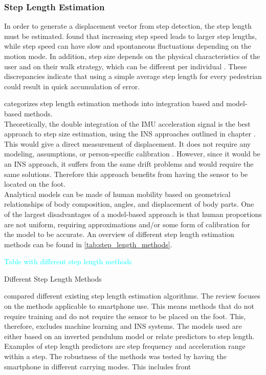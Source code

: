

\subsubsection{Step Length Estimation}
In order to generate a displacement vector from step detection, the step length must be estimated. \citet{Collins2013a} found that increasing step speed leads to larger step lengths, while step speed can have slow and spontaneous fluctuations depending on the motion mode. In addition, step size depends on the physical characteristics of the user and on their walk strategy, which can be different per individual \cite{Diez2018}. These discrepancies indicate that using a simple average step length for every pedestrian could result in quick accumulation of error. 

\citet{Diez2018} categorizes step length estimation methods into integration based and model-based methods. \\
Theoretically, the double integration of the IMU acceleration signal is the best approach to step size estimation, using the INS approaches outlined in chapter . This would give a direct measurement of displacement. It does not require any modeling, assumptions, or person-specific calibration \cite{Diez2018}. However, since it would be an INS approach, it suffers from the same drift problems and would require the same solutions. Therefore this approach benefits from having the sensor to be located on the foot. \\
Analytical models can be made of human mobility based on geometrical relationships of body composition, angles, and displacement of body parts. One of the largest disadvantages of a model-based approach is that human proportions are not uniform, requiring approximations and/or some form of calibration for the model to be accurate.
An overview of different step length estimation methods can be found in \cref{tab:step_length_methods}.

\begin{table}[H]
	\centering
	\textcolor{cyan}{Table with different step length methods}
	\caption{Different Step Length Methods}
	\label{tab:step_length_methods}
\end{table}

\citet{Vezocnik2019} compared different existing step length estimation algorithms. The review focuses on the methods applicable to smartphone use. This means methods that do not require training and do not require the sensor to be placed on the foot. This, therefore, excludes machine learning and INS systems. The models used are either based on an inverted pendulum model or relate predictors to step length. Examples of step length predictors are step frequency and acceleration range within a step. The robustness of the methods was tested by having the smartphone in different carrying modes. This includes front 


